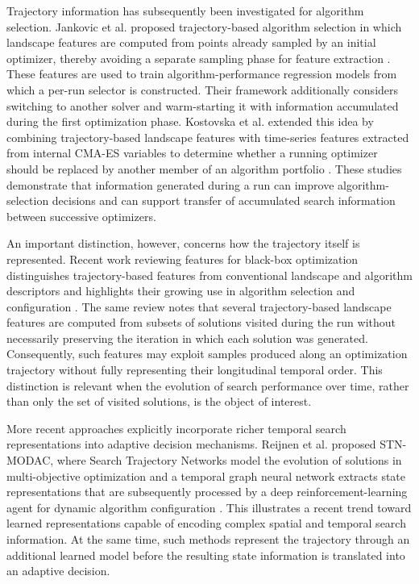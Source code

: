 \documentclass[review]{elsarticle}
\begin{document}
Trajectory information has subsequently been investigated for algorithm
selection. Jankovic et al. proposed trajectory-based algorithm selection in
which landscape features are computed from points already sampled by an
initial optimizer, thereby avoiding a separate sampling phase for feature
extraction \cite{jankovic2022trajectory}. These features are used to train
algorithm-performance regression models from which a per-run selector is
constructed. Their framework additionally considers switching to another
solver and warm-starting it with information accumulated during the first
optimization phase. Kostovska et al. extended this idea by combining
trajectory-based landscape features with time-series features extracted
from internal CMA-ES variables to determine whether a running optimizer
should be replaced by another member of an algorithm portfolio
\cite{kostovska2022per}. These studies demonstrate that information
generated during a run can improve algorithm-selection decisions and can
support transfer of accumulated search information between successive
optimizers.

An important distinction, however, concerns how the trajectory itself is
represented. Recent work reviewing features for black-box optimization
distinguishes trajectory-based features from conventional landscape and
algorithm descriptors and highlights their growing use in algorithm
selection and configuration \cite{cenikj2026survey}. The same review notes
that several trajectory-based landscape features are computed from subsets
of solutions visited during the run without necessarily preserving the
iteration in which each solution was generated. Consequently, such features
may exploit samples produced along an optimization trajectory without fully
representing their longitudinal temporal order. This distinction is relevant
when the evolution of search performance over time, rather than only the set
of visited solutions, is the object of interest.

More recent approaches explicitly incorporate richer temporal search
representations into adaptive decision mechanisms. Reijnen et al. proposed
STN-MODAC, where Search Trajectory Networks model the evolution of solutions
in multi-objective optimization and a temporal graph neural network extracts
state representations that are subsequently processed by a deep
reinforcement-learning agent for dynamic algorithm configuration
\cite{reijnen2025search}. This illustrates a recent trend toward learned
representations capable of encoding complex spatial and temporal search
information. At the same time, such methods represent the trajectory through
an additional learned model before the resulting state information is
translated into an adaptive decision.
\end{document}

